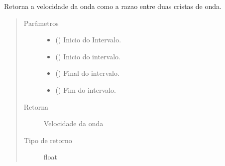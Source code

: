 \documentclass[letterpaper,10pt,brazil]{sphinxmanual}
\begin{document}
\begin{fulllineitems}
\label{\detokenize{source/base:base.wave_velocity}}
Retorna a velocidade da onda como a razao entre duas cristas de onda.
\begin{quote}\begin{description}
\item[{Parâmetros}] \leavevmode\begin{itemize}
\item {} 
 () \textendash{} Inicio do Intervalo.

\item {} 
 () \textendash{} Inicio do intervalo.

\item {} 
 () \textendash{} Final do intervalo.

\item {} 
 () \textendash{} Fim do intervalo.

\end{itemize}

\item[{Retorna}] \leavevmode
Velocidade da onda

\item[{Tipo de retorno}] \leavevmode
float

\end{description}\end{quote}

\end{fulllineitems}

\end{document}
